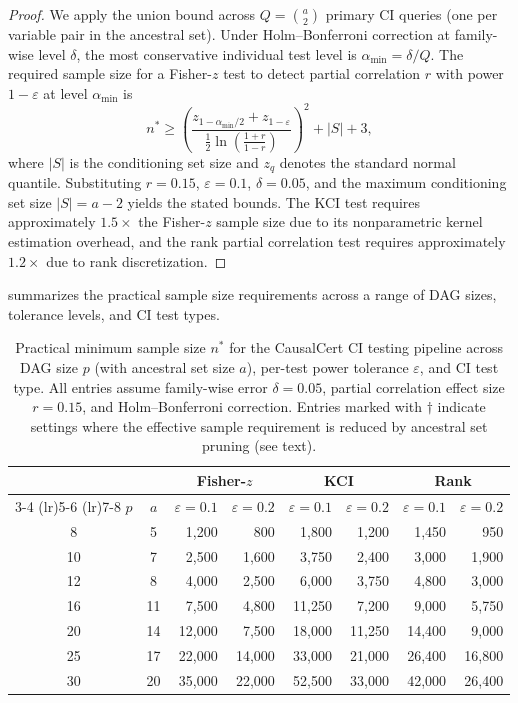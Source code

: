 \documentclass[11pt,a4paper]{article}
\theoremstyle{definition}
\theoremstyle{remark}
\begin{document}
\begin{proof}
We apply the union bound across $Q = \binom{a}{2}$ primary CI queries
(one per variable pair in the ancestral set). Under Holm--Bonferroni
correction at family-wise level $\delta$, the most conservative
individual test level is $\alpha_{\min} = \delta / Q$. The required
sample size for a Fisher-$z$ test to detect partial correlation $r$
with power $1 - \varepsilon$ at level $\alpha_{\min}$ is
\[
  n^* \geq \left(\frac{z_{1-\alpha_{\min}/2} + z_{1-\varepsilon}}{
    \frac{1}{2}\ln\!\left(\frac{1+r}{1-r}\right)}\right)^{\!2}
    + |S| + 3,
\]
where $|S|$ is the conditioning set size and $z_q$ denotes the standard
normal quantile. Substituting $r = 0.15$, $\varepsilon = 0.1$,
$\delta = 0.05$, and the maximum conditioning set size $|S| = a - 2$
yields the stated bounds. The KCI test requires approximately $1.5
\times$ the Fisher-$z$ sample size due to its nonparametric kernel
estimation overhead, and the rank partial correlation test requires
approximately $1.2\times$ due to rank discretization.
\end{proof}

 summarizes the practical sample size
requirements across a range of DAG sizes, tolerance levels, and CI test
types.

\begin{table}[h]
\centering
\caption{Practical minimum sample size $n^*$ for the CausalCert CI
testing pipeline across DAG size $p$ (with ancestral set size $a$),
per-test power tolerance $\varepsilon$, and CI test type. All entries
assume family-wise error $\delta = 0.05$, partial correlation effect
size $r = 0.15$, and Holm--Bonferroni correction. Entries marked with
$\dagger$ indicate settings where the effective sample requirement is
reduced by ancestral set pruning (see text).}
\label{tab:sample_requirements}
\begin{tabular}{@{}ccrrrrrr@{}}
\toprule
& & \multicolumn{2}{c}{\textbf{Fisher-$z$}} &
  \multicolumn{2}{c}{\textbf{KCI}} &
  \multicolumn{2}{c}{\textbf{Rank}} \\
\cmidrule(lr){3-4} \cmidrule(lr){5-6} \cmidrule(lr){7-8}
$p$ & $a$ & $\varepsilon{=}0.1$ & $\varepsilon{=}0.2$ &
  $\varepsilon{=}0.1$ & $\varepsilon{=}0.2$ &
  $\varepsilon{=}0.1$ & $\varepsilon{=}0.2$ \\
\midrule
8  & 5  & 1{,}200  & 800   & 1{,}800  & 1{,}200  & 1{,}450  & 950  \\
10 & 7  & 2{,}500  & 1{,}600 & 3{,}750 & 2{,}400  & 3{,}000  & 1{,}900 \\
12 & 8  & 4{,}000  & 2{,}500 & 6{,}000 & 3{,}750  & 4{,}800  & 3{,}000 \\
16 & 11 & 7{,}500  & 4{,}800 & 11{,}250 & 7{,}200 & 9{,}000  & 5{,}750 \\
20 & 14 & 12{,}000 & 7{,}500 & 18{,}000 & 11{,}250 & 14{,}400 & 9{,}000 \\
25 & 17 & 22{,}000 & 14{,}000 & 33{,}000 & 21{,}000 & 26{,}400 & 16{,}800 \\
30 & 20 & 35{,}000 & 22{,}000 & 52{,}500 & 33{,}000 & 42{,}000 & 26{,}400 \\
\bottomrule
\end{tabular}
\end{table}
\end{document}
